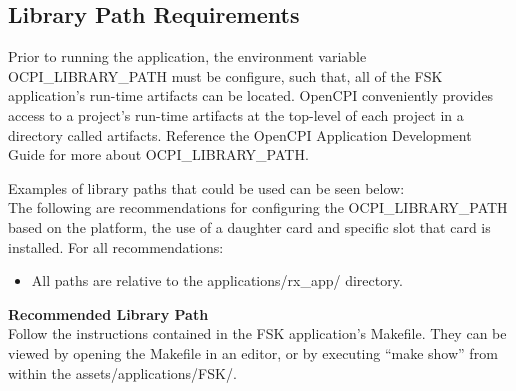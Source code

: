 \subsection{Library Path Requirements}
\noindent Prior to running the application, the environment variable OCPI\_LIBRARY\_PATH must be configure, such that, all of the FSK application's run-time artifacts can be located. OpenCPI conveniently provides access to a project's run-time artifacts at the top-level of each project in a directory called artifacts. Reference the OpenCPI Application Development Guide for more about OCPI\_LIBRARY\_PATH. \par\medskip

\noindent Examples of library paths that could be used can be seen below:\\

\noindent The following are recommendations for configuring the OCPI\_LIBRARY\_PATH based on the platform, the use of a daughter card and specific slot that card is installed. For all recommendations:
\begin{itemize}
  \item All paths are relative to the applications/rx\_app/ directory.\\
\end{itemize}

\noindent\textbf{Recommended Library Path}\\
\noindent
Follow the instructions contained in the FSK application's Makefile. They can be viewed by opening the Makefile in an editor, or by executing ``make show'' from within the assets/applications/FSK/.\\

\pagebreak

